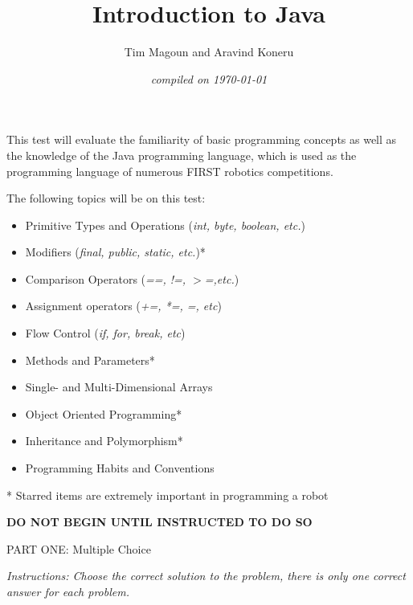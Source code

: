 \documentclass[11pt,fleqn]{article}
\begin{document}
\title{Introduction to \bf{Java}}
\author{Tim Magoun and Aravind Koneru}
\date{\it{compiled on} \today}
\maketitle


This test will evaluate the familiarity of basic programming concepts as well as the knowledge of the
Java programming language, which is used as the programming language of numerous FIRST\textsuperscript\textregistered
robotics competitions.


\vspace{5mm}
The following topics will be on this test:
\begin{itemize}
\item Primitive Types and Operations (\textit{int, byte, boolean, etc.})
\item Modifiers (\textit{final, public, static, etc.})*
\item Comparison Operators (\textit{==, !=, $\mathit{>}$=,etc.})
\item Assignment operators (\textit{+=, *=, =, etc})
\item Flow Control (\textit{if, for, break, etc})
\item Methods and Parameters*
\item Single- and Multi-Dimensional Arrays
\item Object Oriented Programming*
\item Inheritance and Polymorphism*
\item Programming Habits and Conventions
\end{itemize}

* Starred items are extremely important in programming a robot
\vfill
\begin{center}
\textbf{DO NOT BEGIN UNTIL INSTRUCTED TO DO SO}
\end{center}
\newpage

\begin{center}
\begin{large}
PART ONE: Multiple Choice
\end{large}
\end{center}
\textit{Instructions: Choose the correct solution to the problem, there is only one correct answer for each problem.}
\end{document}
